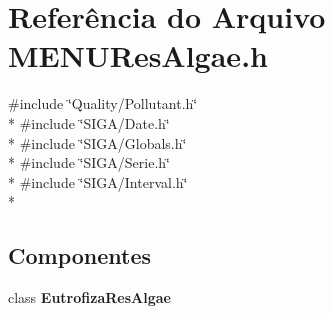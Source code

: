 \section{Referência do Arquivo M\+E\+N\+U\+Res\+Algae.\+h}
\label{_m_e_n_u_res_algae_8h}
{\ttfamily \#include \char`\"{}Quality/\+Pollutant.\+h\char`\"{}}\\*
{\ttfamily \#include \char`\"{}S\+I\+G\+A/\+Date.\+h\char`\"{}}\\*
{\ttfamily \#include \char`\"{}S\+I\+G\+A/\+Globals.\+h\char`\"{}}\\*
{\ttfamily \#include \char`\"{}S\+I\+G\+A/\+Serie.\+h\char`\"{}}\\*
{\ttfamily \#include \char`\"{}S\+I\+G\+A/\+Interval.\+h\char`\"{}}\\*
\subsection*{Componentes}
\begin{DoxyCompactItemize}
\item 
class {\bf Eutrofiza\+Res\+Algae}
\end{DoxyCompactItemize}
